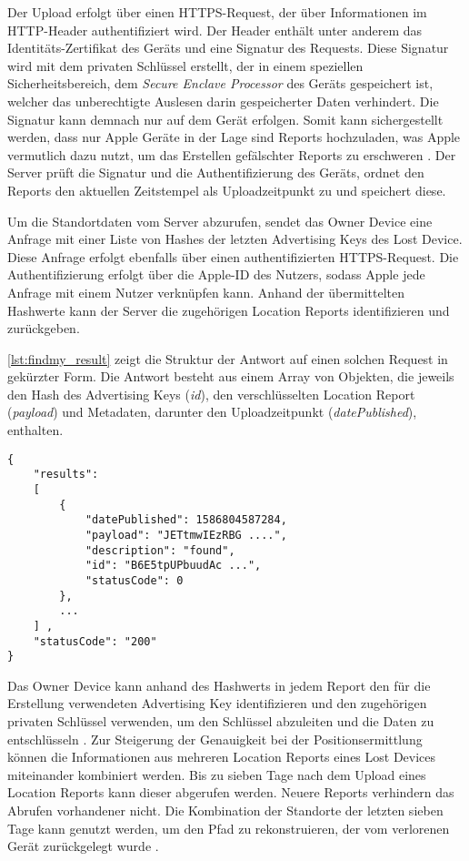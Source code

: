 Der Upload erfolgt über einen HTTPS-Request, der über Informationen im HTTP-Header authentifiziert wird.
Der Header enthält unter anderem das Identitäts-Zertifikat des Geräts und eine Signatur des Requests.
Diese Signatur wird mit dem privaten Schlüssel erstellt, der in einem speziellen Sicherheitsbereich, dem \textit{Secure Enclave Processor} des Geräts gespeichert ist, welcher das unberechtigte Auslesen darin gespeicherter Daten verhindert.
Die Signatur kann demnach nur auf dem Gerät erfolgen.
Somit kann sichergestellt werden, dass nur Apple Geräte in der Lage sind Reports hochzuladen, was Apple vermutlich dazu nutzt, um das Erstellen gefälschter Reports zu erschweren \cite{Heinrich_FindMy}.
Der Server prüft die Signatur und die Authentifizierung des Geräts, ordnet den Reports den aktuellen Zeitstempel als Uploadzeitpunkt zu und speichert diese.

Um die Standortdaten vom Server abzurufen, sendet das Owner Device eine Anfrage mit einer Liste von Hashes der letzten Advertising Keys des Lost Device.
Diese Anfrage erfolgt ebenfalls über einen authentifizierten HTTPS-Request.
Die Authentifizierung erfolgt über die Apple-ID des Nutzers, sodass Apple jede Anfrage mit einem Nutzer verknüpfen kann.
Anhand der übermittelten Hashwerte kann der Server die zugehörigen Location Reports identifizieren und zurückgeben.

\autoref{lst:findmy_result} zeigt die Struktur der Antwort auf einen solchen Request in gekürzter Form.
Die Antwort besteht aus einem Array von Objekten, die jeweils den Hash des Advertising Keys (\textit{id}), den verschlüsselten Location Report (\textit{payload}) und Metadaten, darunter den Uploadzeitpunkt (\textit{datePublished}), enthalten.
\begin{lstlisting}[label=lst:findmy_result,caption={Beispielhafte Antwort beim herunterladen von Location Reports\cite{Heinrich_FindMy}.}]
{
    "results": 
    [
        {
            "datePublished": 1586804587284,
            "payload": "JETtmwIEzRBG ....",
            "description": "found",
            "id": "B6E5tpUPbuudAc ...",
            "statusCode": 0
        },
        ...
    ] ,
    "statusCode": "200"
}
\end{lstlisting}

Das Owner Device kann anhand des Hashwerts in jedem Report den für die Erstellung verwendeten Advertising Key identifizieren und den zugehörigen privaten Schlüssel verwenden, um den Schlüssel abzuleiten und die Daten zu entschlüsseln \cite{Heinrich_FindMy}.
Zur Steigerung der Genauigkeit bei der Positionsermittlung können die Informationen aus mehreren Location Reports eines Lost Devices miteinander kombiniert werden.
Bis zu sieben Tage nach dem Upload eines Location Reports kann dieser abgerufen werden.
Neuere Reports verhindern das Abrufen vorhandener nicht.
Die Kombination der Standorte der letzten sieben Tage kann genutzt werden, um den Pfad zu rekonstruieren, der vom verlorenen Gerät zurückgelegt wurde \cite{Heinrich_FindMy}.
